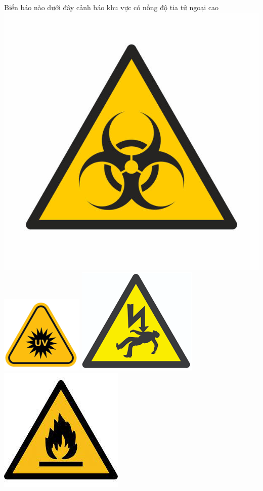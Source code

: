 \begin{ex}
	Biển báo nào dưới đây cảnh báo khu vực có nồng độ tia tử ngoại cao
	\choice
	{\includegraphics[scale=0.5]{../figs/FINAL-SEM1-005-1}}
	{\True \includegraphics[scale=0.6]{../figs/FINAL-SEM1-005-2}}
	{\includegraphics[scale=0.3]{../figs/FINAL-SEM1-005-3}}
	{\includegraphics[scale=0.3]{../figs/FINAL-SEM1-005-4}}
	\loigiai{}
\end{ex}

